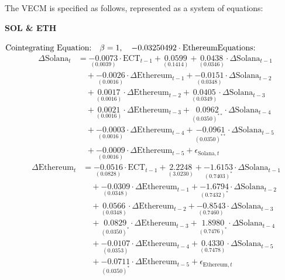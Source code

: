 \noindent The VECM is specified as follows, represented as a system of equations:\\

\begin{center}
    \textbf{SOL \& ETH}
\end{center}
$\text{Cointegrating Equation:} \quad  \beta = 1, \quad -0.03250492 \cdot \text{Ethereum} \\
\text{Equations:}$
\begin{align*} \quad
\Delta \text{Solana}_t &= 
\underset{(0.0039)}{-0.0073} \cdot \text{ECT}_{t-1} + 
\underset{(0.1414)}{0.0599} + 
\underset{(0.0346)}{0.0438} \cdot \Delta \text{Solana}_{t-1} \\
&\quad + \underset{(0.0016)}{-0.0026} \cdot \Delta \text{Ethereum}_{t-1} + 
\underset{(0.0348)}{-0.0151} \cdot \Delta \text{Solana}_{t-2} \\
&\quad + \underset{(0.0016)}{0.0017} \cdot \Delta \text{Ethereum}_{t-2} + 
\underset{(0.0349)}{0.0405} \cdot \Delta \text{Solana}_{t-3} \\
&\quad + \underset{(0.0016)}{0.0021} \cdot \Delta \text{Ethereum}_{t-3} + 
\underset{(0.0350)^{**}}{0.0962} \cdot \Delta \text{Solana}_{t-4} \\
&\quad + \underset{(0.0016)}{-0.0003} \cdot \Delta \text{Ethereum}_{t-4} + 
\underset{(0.0350)^{**}}{-0.0961} \cdot \Delta \text{Solana}_{t-5} \\
&\quad + \underset{(0.0016)}{-0.0009} \cdot \Delta \text{Ethereum}_{t-5} + \epsilon_{\text{Solana},t}
\end{align*}
\begin{align*}
 \quad
\Delta \text{Ethereum}_t &= 
\underset{(0.0828)}{-0.0516} \cdot \text{ECT}_{t-1} + 
\underset{(3.0230)}{2.2248} + 
\underset{(0.7403)^*}{-1.6153} \cdot \Delta \text{Solana}_{t-1} \\
&\quad + \underset{(0.0348)}{-0.0309} \cdot \Delta \text{Ethereum}_{t-1} + 
\underset{(0.7432)^*}{-1.6794} \cdot \Delta \text{Solana}_{t-2} \\
&\quad + \underset{(0.0348)}{0.0566} \cdot \Delta \text{Ethereum}_{t-2} + 
\underset{(0.7460)}{-0.8543} \cdot \Delta \text{Solana}_{t-3} \\
&\quad + \underset{(0.0350)^*}{0.0829} \cdot \Delta \text{Ethereum}_{t-3} + 
\underset{(0.7476)^*}{1.8980} \cdot \Delta \text{Solana}_{t-4} \\
&\quad + \underset{(0.0353)}{-0.0107} \cdot \Delta \text{Ethereum}_{t-4} + 
\underset{(0.7478)}{0.4330} \cdot \Delta \text{Solana}_{t-5} \\
&\quad + \underset{(0.0350)^*}{-0.0711} \cdot \Delta \text{Ethereum}_{t-5} + \epsilon_{\text{Ethereum},t}
\end{align*}

